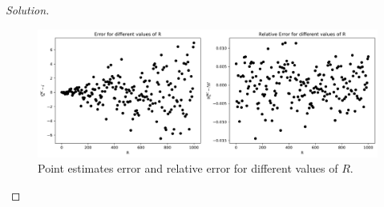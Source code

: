 \documentclass[a4paper,10pt, notitlepage]{report}
\begin{document}
\begin{enumerate}
\begin{proof}[Solution]
\begin{figure}[ht]
    \centering
    \includegraphics[width=\textwidth]{figure_simulation_R.png}
    \caption{Point estimates error and relative error for different values of $R$.}
    \label{fig:simulations-r}
\end{figure}

\end{proof}

\end{enumerate}



% 


\end{document}
